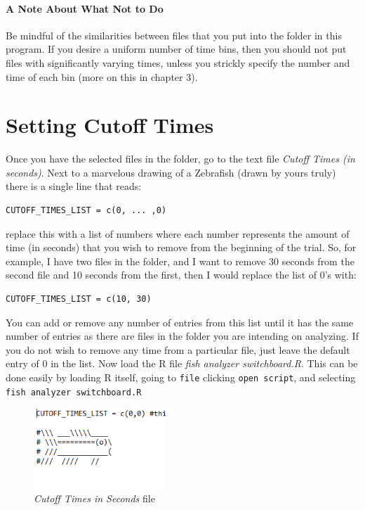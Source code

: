 \documentclass[12pt,titlepage]{report}
\begin{document}
\paragraph{A Note About What Not to Do}
Be mindful of the similarities between files that you put into the folder in this program. If you desire a uniform number of time bins, then you should not put files with significantly varying times, unless you strickly specify the number and time of each bin (more on this in chapter 3). \\
\section{Setting Cutoff Times}
Once you have the selected files in the folder, go to the text file \emph{Cutoff Times (in seconds)}. Next to a marvelous drawing of a Zebrafish (drawn by yours truly) there is a single line that reads:
\begin{verbatim}
CUTOFF_TIMES_LIST = c(0, ... ,0)
\end{verbatim}

replace this with a list of numbers where each number represents the amount of time (in seconds) that you wish to remove from the beginning of the trial. So, for example, I have two files in the folder, and I want to remove 30 seconds from the second file  and 10 seconds from the first, then I would replace the list of 0's with:
\begin{verbatim}
CUTOFF_TIMES_LIST = c(10, 30)
\end{verbatim}
You can add or remove any number of entries from this list until it has the same number of entries as there are files in the folder you are intending on analyzing. If you do not wish to remove any time from a particular file, just leave the default entry of 0 in the list.
Now load the R file \emph{ fish analyzer switchboard.R}. This can be done easily by loading R itself, going to \texttt{file} clicking \texttt{open script}, and selecting \texttt{ fish analyzer switchboard.R}
\begin{figure}[ht!]
\centering
\includegraphics[width=50mm]{image2.png}
\caption{\emph{Cutoff Times in Seconds} file}
\label{overflow}
\end{figure}
\end{document}

